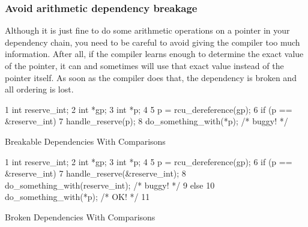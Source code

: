 \subsubsection{Avoid arithmetic dependency breakage}
Although it is just fine to do some arithmetic operations on a pointer in
your dependency chain, you need to be careful to avoid giving the
compiler too much information.
After all, if the compiler learns enough to determine the exact value
of the pointer, it can and sometimes will use that exact value instead
of the pointer itself.
As soon as the compiler does that, the dependency is broken and all
ordering is lost.

\begin{listing}[tbp]
{ \scriptsize
\begin{verbbox}
 1 int reserve_int;
 2 int *gp;
 3 int *p;
 4
 5 p = rcu_dereference(gp);
 6 if (p == &reserve_int)
 7   handle_reserve(p);
 8 do_something_with(*p); /* buggy! */
\end{verbbox}
}
\centering
\theverbbox
\caption{Breakable Dependencies With Comparisons}
\label{lst:memorder:Breakable Dependencies With Comparisons}
\end{listing}

\begin{listing}[tbp]
{ \scriptsize
\begin{verbbox}
 1 int reserve_int;
 2 int *gp;
 3 int *p;
 4
 5 p = rcu_dereference(gp);
 6 if (p == &reserve_int) {
 7   handle_reserve(&reserve_int);
 8   do_something_with(reserve_int); /* buggy! */
 9 } else {
10   do_something_with(*p); /* OK! */
11 }
\end{verbbox}
}
\centering
\theverbbox
\caption{Broken Dependencies With Comparisons}
\label{lst:memorder:Broken Dependencies With Comparisons}
\end{listing}

